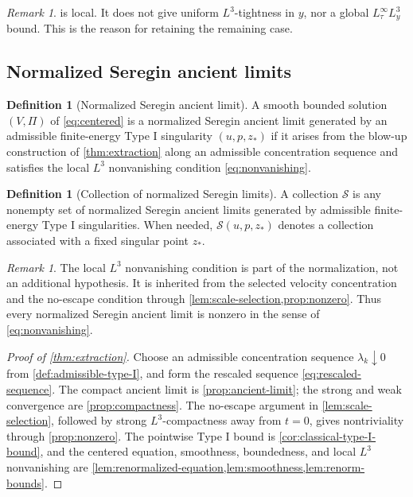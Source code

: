 \documentclass[11pt]{amsart}
\theoremstyle{plain}
\theoremstyle{definition}
\newtheorem{definition}[theorem]{Definition}
\theoremstyle{remark}
\newtheorem{remark}[theorem]{Remark}
\numberwithin{equation}{section}
\newcommand{\calS}{\mathcal S}
\begin{document}
\begin{remark}\label{rem:no-global-tightness}
 is local.  It does not give uniform
\(L^3\)-tightness in \(y\), nor a global \(L^\infty_\tau L^3_y\) bound.  This
is the reason for retaining the remaining case.
\end{remark}

\subsection{Normalized Seregin ancient limits}

\begin{definition}[Normalized Seregin ancient limit]\label{def:seregin-limit}
A smooth bounded solution \((V,\Pi)\) of \eqref{eq:centered} is a normalized
Seregin ancient limit generated by an admissible finite-energy Type I
singularity \((u,p,z_*)\) if it arises from the blow-up construction of
\cref{thm:extraction} along an admissible concentration sequence and satisfies
the local \(L^3\) nonvanishing condition \eqref{eq:nonvanishing}.
\end{definition}

\begin{definition}[Collection of normalized Seregin limits]
\label{def:seregin-collection}
A collection \(\calS\) is any nonempty set of normalized Seregin ancient
limits generated by admissible finite-energy Type I singularities.  When
needed, \(\calS(u,p,z_*)\) denotes a collection associated with a fixed
singular point \(z_*\).
\end{definition}

\begin{remark}
The local \(L^3\) nonvanishing condition is part of the normalization, not an
additional hypothesis.  It is inherited from the selected velocity
concentration and the no-escape condition through
\cref{lem:scale-selection,prop:nonzero}.  Thus every normalized Seregin
ancient limit is nonzero in the sense of \eqref{eq:nonvanishing}.
\end{remark}

\begin{proof}[Proof of \cref{thm:extraction}]
Choose an admissible concentration sequence
\(\lambda_k\downarrow0\) from \cref{def:admissible-type-I}, and form the
rescaled sequence \eqref{eq:rescaled-sequence}.  The compact ancient limit is
\cref{prop:ancient-limit}; the strong and weak convergence are
\cref{prop:compactness}.  The no-escape argument in
\cref{lem:scale-selection}, followed by strong \(L^3\)-compactness away from
\(t=0\), gives nontriviality through \cref{prop:nonzero}.  The pointwise
Type I bound is \cref{cor:classical-type-I-bound}, and the centered equation,
smoothness, boundedness, and local \(L^3\) nonvanishing are
\cref{lem:renormalized-equation,lem:smoothness,lem:renorm-bounds}.
\end{proof}
\end{document}
